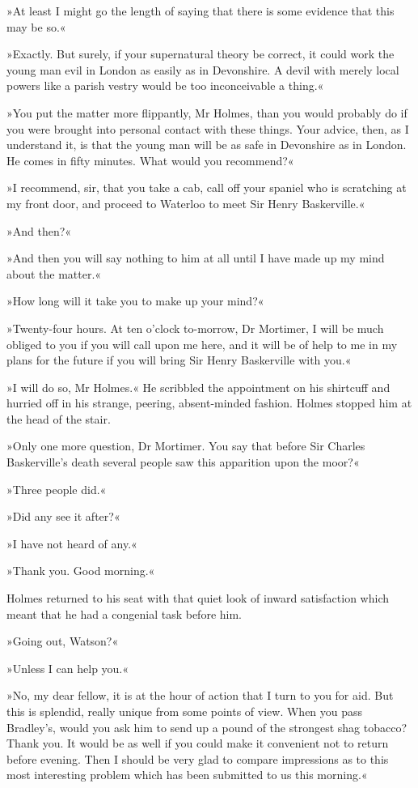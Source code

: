 »At least I might go the length of saying that there is some evidence that this may be so.«

»Exactly. But surely, if your supernatural theory be correct, it could work the young man evil in London as easily as in Devonshire. A devil with merely local powers like a parish vestry would be too inconceivable a thing.«

»You put the matter more flippantly, Mr Holmes, than you would probably do if you were brought into personal contact with these things. Your advice, then, as I understand it, is that the young man will be as safe in Devonshire as in London. He comes in fifty minutes. What would you recommend?«

»I recommend, sir, that you take a cab, call off your spaniel who is scratching at my front door, and proceed to Waterloo to meet Sir Henry Baskerville.«

»And then?«

»And then you will say nothing to him at all until I have made up my mind about the matter.«

»How long will it take you to make up your mind?«

»Twenty-four hours. At ten o'clock to-morrow, Dr Mortimer, I will be much obliged to you if you will call upon me here, and it will be of help to me in my plans for the future if you will bring Sir Henry Baskerville with you.«

»I will do so, Mr Holmes.« He scribbled the appointment on his shirtcuff and hurried off in his strange, peering, absent-minded fashion. Holmes stopped him at the head of the stair.

»Only one more question, Dr Mortimer. You say that before Sir Charles Baskerville's death several people saw this apparition upon the moor?«

»Three people did.«

»Did any see it after?«

»I have not heard of any.«

»Thank you. Good morning.«

Holmes returned to his seat with that quiet look of inward satisfaction which meant that he had a congenial task before him.

»Going out, Watson?«

»Unless I can help you.«

»No, my dear fellow, it is at the hour of action that I turn to you for aid. But this is splendid, really unique from some points of view. When you pass Bradley's, would you ask him to send up a pound of the strongest shag tobacco? Thank you. It would be as well if you could make it convenient not to return before evening. Then I should be very glad to compare impressions as to this most interesting problem which has been submitted to us this morning.«

